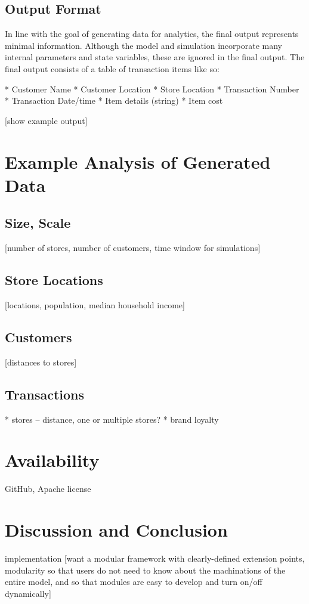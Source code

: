 \documentclass[conference]{IEEEtran}
\begin{document}
\subsection{Output Format}

In line with the goal of generating data for analytics, the final output represents minimal information.  Although the model and simulation incorporate many internal parameters and state variables, these are ignored in the final output.  The final output consists of a table of transaction items like so:

* Customer Name
* Customer Location
* Store Location
* Transaction Number
* Transaction Date/time
* Item details (string)
* Item cost

[show example output]

\section{Example Analysis of Generated Data}
\subsection{Size, Scale}
[number of stores, number of customers, time window for simulations]

\subsection{Store Locations}
[locations, population, median household income]

\subsection{Customers}
[distances to stores]

\subsection{Transactions}

* stores -- distance, one or multiple stores?
* brand loyalty

\section{Availability}
GitHub, Apache license

\section{Discussion and Conclusion}
implementation
[want a modular framework with clearly-defined extension points, modularity so that users do not need to know about the machinations of the entire model, and so that modules are easy to develop and turn on/off dynamically]
\end{document}
